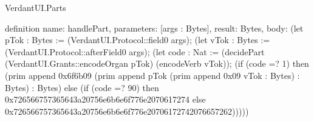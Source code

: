 \begin{lexlean}{VerdantUI.Parts}
\begin{semanticmodule}
definition{
  name: handlePart,
  parameters: [args : Bytes],
  result: Bytes,
  body: (let pTok : Bytes := (VerdantUI.Protocol::field0 args);
    (let vTok : Bytes := (VerdantUI.Protocol::afterField0 args);
    (let code : Nat := (decidePart (VerdantUI.Grants::encodeOrgan pTok) (encodeVerb vTok));
    (if (code =? 1) then (prim append 0x6f6b09 (prim append pTok (prim append 0x09 vTok : Bytes) : Bytes) : Bytes) else
      (if (code =? 90) then 0x726566757365643a20756e6b6e6f776e2070617274 else
      0x726566757365643a20756e6b6e6f776e20706172742076657262)))))
}
\end{semanticmodule}
\end{lexlean}
